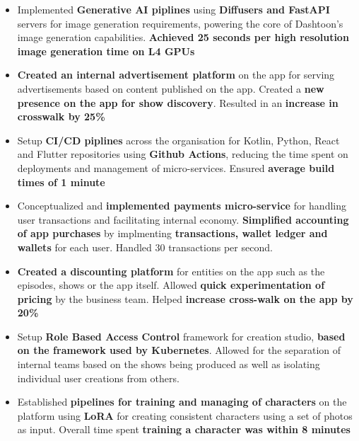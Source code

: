 \documentclass[12pt]{article}
\newcommand{\experienceItem}{\item [-] \small}
\begin{document}
{{{\begin{itemize}[itemsep=0.1ex, leftmargin=6ex, rightmargin=1ex]
{                        \textbf {7 Kubernetes clusters}, giving real time insights on latencies and errors.
                        \textbf {Reduced mean time to resolve issues by 50\%}
                    }
                    \experienceItem
                    {
                        Implemented \textbf {Generative AI piplines} using \textbf {Diffusers and FastAPI} servers for
                        image \mbox {generation} requirements, powering the core of Dashtoon's image generation capabilities.
                        \textbf {Achieved 25 seconds per high resolution image generation time on L4 GPUs}
                    }
                    \experienceItem
                    {
                        \textbf {Created an internal advertisement platform} on the app for serving advertisements based on
                        content published on the app. Created a \textbf {new presence on the app for show discovery}.
                        Resulted in an \textbf {increase in crosswalk by 25\%}
                    }
                    \experienceItem
                    {
                        Setup \textbf {CI/CD piplines} across the organisation for Kotlin, Python, React and Flutter
                        \mbox {repositories} using \textbf {Github Actions}, reducing the time spent on deployments and
                        management of micro-services. Ensured \textbf {average build times of 1 minute}
                    }
                    \experienceItem
                    {
                        Conceptualized and \textbf {implemented payments micro-service} for handling user transactions and
                        facilitating internal economy. \textbf {Simplified accounting of app purchases} by implmenting
                        \textbf {transactions, wallet ledger and wallets} for each user. Handled 30 transactions per second.
                    }
                    \experienceItem
                    {
                        \textbf {Created a discounting platform} for entities on the app such as the episodes, shows
                        or the app itself. Allowed \textbf {quick experimentation of pricing} by the business team.
                        Helped \textbf {increase cross-walk on the app by 20\%}
                    }
                    \experienceItem
                    {
                        Setup \textbf {Role Based Access Control} framework for creation studio, \textbf {based on the
                        framework used by Kubernetes}. Allowed for the separation of internal teams based on the shows
                        being produced as well as isolating individual user creations from others.
                    }
                    \experienceItem
                    {
                        Established \textbf {pipelines for training and managing of characters} on the platform using
                        \textbf {LoRA} for creating consistent characters using a set of photos as input. Overall time
                        spent \textbf {training a character was within 8 minutes}
                    }
                \end{itemize}
            }
        }

}
\end{document}
